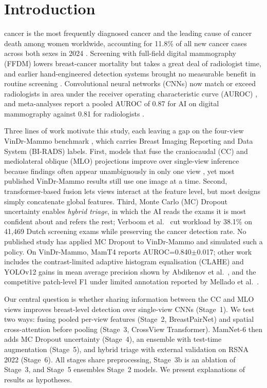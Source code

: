 \documentclass[conference]{IEEEtran}
\newcommand{\vindr}{VinDr-Mammo}
\newcommand{\rsna}{RSNA 2022}
\newcommand{\mamnet}{MamNet-6}
\begin{document}
\section{Introduction}

 cancer is the most frequently diagnosed cancer and the leading cause of cancer death among women worldwide, accounting for 11.8\% of all new cancer cases across both sexes in 2024 \cite{20}. Screening with full-field digital mammography (FFDM) lowers breast-cancer mortality but takes a great deal of radiologist time, and earlier hand-engineered detection systems brought no measurable benefit in routine screening \cite{17}. Convolutional neural networks (CNNs) now match or exceed radiologists in area under the receiver operating characteristic curve (AUROC) \cite{11}, and meta-analyses report a pooled AUROC of 0.87 for AI on digital mammography against 0.81 for radiologists \cite{4}.

Three lines of work motivate this study, each leaving a gap on the four-view \vindr{} benchmark \cite{1}, which carries Breast Imaging Reporting and Data System (BI-RADS) labels. First, models that fuse the craniocaudal (CC) and mediolateral oblique (MLO) projections improve over single-view inference because findings often appear unambiguously in only one view \cite{10}, yet most published \vindr{} results still use one image at a time. Second, transformer-based fusion lets views interact at the feature level, but most designs simply concatenate global features. Third, Monte Carlo (MC) Dropout uncertainty \cite{13} enables \emph{hybrid triage}, in which the AI reads the exams it is most confident about and refers the rest; Verboom et al.\ \cite{12} cut workload by 38.1\% on 41,469 Dutch screening exams while preserving the cancer detection rate. No published study has applied MC Dropout to \vindr{} and simulated such a policy. On \vindr{}, MamT4 \cite{18} reports AUROC=0.840$\pm$0.017; other work includes the contrast-limited adaptive histogram equalisation (CLAHE) and YOLOv12 gains in mean average precision shown by Abdikenov et al.\ \cite{2}, and the competitive patch-level F1 under limited annotation reported by Mellado et al.\ \cite{3}.

Our central question is whether sharing information between the CC and MLO views improves breast-level detection over single-view CNNs (Stage~1). We test two ways: fusing pooled per-view features (Stage~2, BreastPairNet) and spatial cross-attention before pooling (Stage~3, CrossView Transformer). \mamnet{} then adds MC Dropout uncertainty (Stage~4), an ensemble with test-time augmentation (Stage~5), and hybrid triage with external validation on \rsna{} (Stage~6). All stages share preprocessing, Stage~3b is an ablation of Stage~3, and Stage~5 ensembles Stage~2 models. We present explanations of results as hypotheses.
\end{document}
